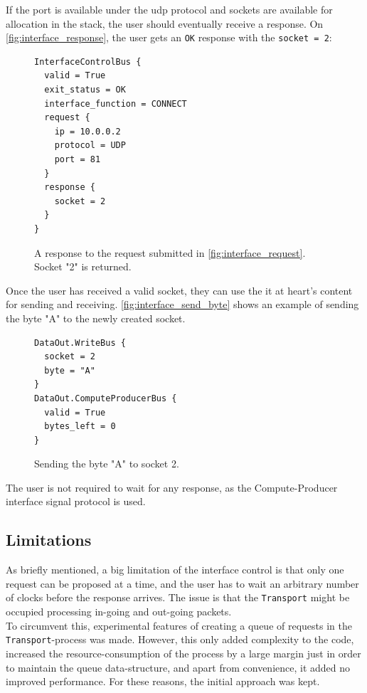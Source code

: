 If the port is available under the \gls{udp} protocol and sockets are available
for allocation in the stack, the user should eventually receive a response.
On \autoref{fig:interface_response}, the user gets an \texttt{OK} response with the \texttt{socket = 2}:
\begin{figure}
	\centering
\begin{Verbatim}[frame=single,samepage=true]
InterfaceControlBus {
  valid = True
  exit_status = OK
  interface_function = CONNECT
  request {
    ip = 10.0.0.2
    protocol = UDP
    port = 81
  }
  response {
    socket = 2
  }
}
\end{Verbatim}
	\caption{A response to the request submitted in
	\autoref{fig:interface_request}. Socket "2" is returned.}
	\label{fig:interface_response}
\end{figure}
Once the user has received a valid socket, they can use the it at heart's
content for sending and receiving. \autoref{fig:interface_send_byte} shows
an example of sending the byte "A" to the newly created socket.
\begin{figure}
	\centering
\begin{Verbatim}[frame=single,samepage=true]
DataOut.WriteBus {
  socket = 2
  byte = "A"
}
DataOut.ComputeProducerBus {
  valid = True
  bytes_left = 0
}
\end{Verbatim}
	\caption{Sending the byte "A" to socket 2.}
	\label{fig:interface_send_byte}
\end{figure}
The user is not required to wait for any response, as the Compute-Producer
interface signal protocol is used.


\subsection{Limitations}
As briefly mentioned, a big limitation of the interface control is that only
one request can be proposed at a time, and the user has to wait an arbitrary
number of clocks before the response arrives. The issue is that the
\texttt{Transport} might be occupied processing in-going and out-going
packets.\\
To circumvent this, experimental features of creating a queue of requests in
the \texttt{Transport}-process was made. However, this only added complexity to
the code, increased the resource-consumption of the process by a large margin
just in order to maintain the queue data-structure, and apart from convenience,
it added no improved performance. For these reasons, the initial approach was
kept.













